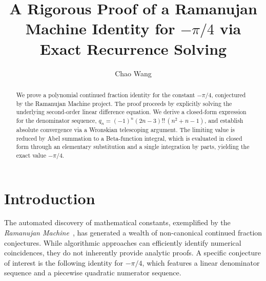 \documentclass[11pt,reqno]{amsart}
\theoremstyle{definition}
\begin{document}
\title[Exact Proof for $-\pi/4$]{A Rigorous Proof of a Ramanujan Machine
  Identity for $-\pi/4$ via Exact Recurrence Solving}

\author{Chao Wang}
\address{School of Future Technology, Shanghai University}
\date{}

\begin{abstract}
We prove a polynomial continued fraction identity for the constant $-\pi/4$, conjectured by the Ramanujan Machine project. The proof proceeds by explicitly solving the underlying second-order linear difference equation. We derive a closed-form expression for the denominator sequence, $q_n = (-1)^n (2n-3)!!\,(n^2+n-1)$, and establish absolute convergence via a Wronskian telescoping argument. The limiting value is reduced by Abel summation to a Beta-function integral, which is evaluated in closed form through an elementary substitution and a single integration by parts, yielding the exact value $-\pi/4$.
\end{abstract}



\maketitle

\section{Introduction}

The automated discovery of mathematical constants, exemplified by the
\textit{Ramanujan Machine}~\cite{raayoni2021generating}, has generated a
wealth of non-canonical continued fraction conjectures. While algorithmic
approaches can efficiently identify numerical coincidences, they do not
inherently provide analytic proofs. A specific conjecture of interest is the
following identity for $-\pi/4$, which features a linear denominator
sequence and a piecewise quadratic numerator sequence.
\end{document}
